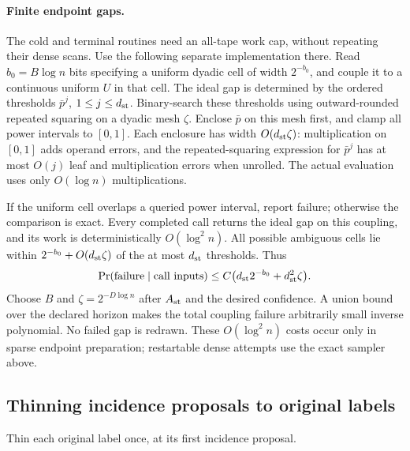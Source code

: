 \documentclass[11pt]{article}
\theoremstyle{remark}
\begin{document}
\paragraph{Finite endpoint gaps.}\label{par:ram-stream-endpoint}
The cold and terminal routines need an all-tape work cap, without repeating
their dense scans.
Use the following separate implementation there.
Read $b_0=B \log n$ bits specifying a uniform dyadic cell of width $2^{-b_0}$, and
couple it to a continuous uniform $U$ in that cell.
The ideal gap is determined by the ordered thresholds $\bar p^j$, $1\le j\le d_{\rm st}$.
Binary-search these thresholds using outward-rounded repeated squaring on a
dyadic mesh $\zeta$.
Enclose $\bar p$ on this mesh first, and clamp all power intervals to $[0,1]$.
Each enclosure has width $O(d_{\rm st}\zeta)$: multiplication on $[0,1]$ adds operand
errors, and the repeated-squaring expression for $\bar p^j$ has at most $O(j)$ leaf
and multiplication errors when unrolled.
The actual evaluation uses only $O(\log n)$ multiplications.

If the uniform cell overlaps a queried power interval, report failure; otherwise
the comparison is exact.
Every completed call returns the ideal gap on this coupling, and its work is
deterministically $O(\log^2 n)$.
All possible ambiguous cells lie within $2^{-b_0}+O(d_{\rm st}\zeta)$ of the at most $d_{\rm st}$
thresholds.
Thus
\[
 \Pr(\text{failure}\mid\text{call inputs})
       \le C\bigl(d_{\rm st}2^{-b_0}+d_{\rm st}^2\zeta\bigr).
\]
Choose $B$ and $\zeta=2^{-D \log n}$ after $A_{\rm st}$ and the desired confidence.
A union bound over the declared horizon makes the total coupling failure
arbitrarily small inverse polynomial.
No failed gap is redrawn.
These $O(\log^2 n)$ costs occur only in sparse endpoint preparation; restartable
dense attempts use the exact sampler above.

\subsection{Thinning incidence proposals to original labels}

Thin each original label once, at its first incidence proposal.
\end{document}
